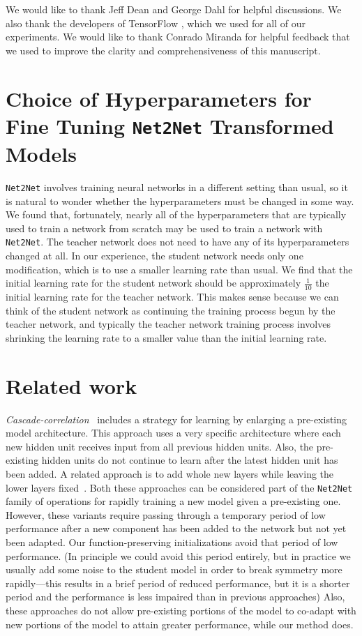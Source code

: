 \documentclass{article} %
\begin{document}
We would like to thank Jeff Dean and George Dahl for helpful discussions.
We also thank the developers of TensorFlow \citep{tensorflow2015-whitepaper},
which we used for all of our experiments. We would like to thank
Conrado Miranda for helpful feedback that we used to improve the
clarity and comprehensiveness of this manuscript.


\small{

}


\appendix
\section{Choice of Hyperparameters for Fine Tuning {\tt Net2Net} Transformed Models}

{\tt Net2Net} involves training neural networks in a different setting than
usual, so it is natural to wonder whether the hyperparameters must be changed
in some way.
We found that, fortunately, nearly all of the hyperparameters that are
typically used to train a network from scratch may be used to train
a network with {\tt Net2Net}.
The teacher network does not need to have any of its hyperparameters
changed at all.
In our experience, the student network needs only one modification, which
is to use a smaller learning rate than usual.
We find that the initial learning rate for the student network should
be approximately $\frac{1}{10}$ the initial learning rate for the
teacher network.
This makes sense because we can think of the student network as continuing
the training process begun by the teacher network, and typically the
teacher network training process involves shrinking the learning rate
to a smaller value than the initial learning rate.

\section{Related work}

{\em Cascade-correlation}~\citep{Fahlman90} includes a strategy for
learning by enlarging a pre-existing model architecture. This approach
uses a very specific architecture where each new hidden unit receives
input from all previous hidden units. Also, the pre-existing hidden units
do not continue to learn after the latest hidden unit has been added.
A related approach is to add whole new layers
while leaving the lower layers fixed~\citep{gutstein2008knowledge}.
Both these approaches can be considered part of the {\tt Net2Net} family
of operations for rapidly training a new model given a pre-existing one.
However, these variants
require passing through a temporary period of
low performance after a new component has been added to the network
but not yet been adapted. Our function-preserving initializations avoid
that period of low performance.
(In principle we could avoid this period entirely, but in practice we
usually add some noise to the student model in order to break symmetry
more rapidly---this results in a brief period of reduced performance,
but it is a shorter period and the performance is less impaired than
in previous approaches)
Also, these approaches do not allow
pre-existing portions of the model to co-adapt with new portions of the
model to attain greater performance, while our method does.
\end{document}
